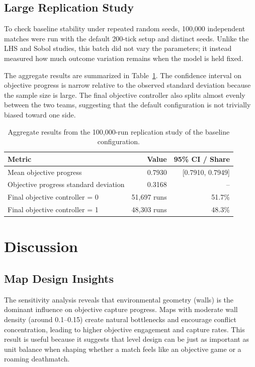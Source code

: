 \documentclass{assignment}
\begin{document}
\subsection{Large Replication Study}

To check baseline stability under repeated random seeds, 100,000 independent matches were run with the default 200-tick setup and distinct seeds. Unlike the LHS and Sobol studies, this batch did not vary the parameters; it instead measured how much outcome variation remains when the model is held fixed.

The aggregate results are summarized in Table~\ref{tab:large_replication_study}. The confidence interval on objective progress is narrow relative to the observed standard deviation because the sample size is large. The final objective controller also splits almost evenly between the two teams, suggesting that the default configuration is not trivially biased toward one side.

\begin{table}[h]
  \centering
  \begin{tabular}{lrr}
    \toprule
    \textbf{Metric} & \textbf{Value} & \textbf{95\% CI / Share} \\
    \midrule
    Mean objective progress & 0.7930 & [0.7910, 0.7949] \\
    Objective progress standard deviation & 0.3168 & -- \\
    Final objective controller = 0 & 51,697 runs & 51.7\% \\
    Final objective controller = 1 & 48,303 runs & 48.3\% \\
    \bottomrule
  \end{tabular}
  \caption{Aggregate results from the 100,000-run replication study of the baseline configuration.}
  \label{tab:large_replication_study}
\end{table}

\section{Discussion}

\subsection{Map Design Insights}

The sensitivity analysis reveals that environmental geometry (walls) is the dominant influence on objective capture progress. Maps with moderate wall density (around 0.1--0.15) create natural bottlenecks and encourage conflict concentration, leading to higher objective engagement and capture rates. This result is useful because it suggests that level design can be just as important as unit balance when shaping whether a match feels like an objective game or a roaming deathmatch.
\end{document}
